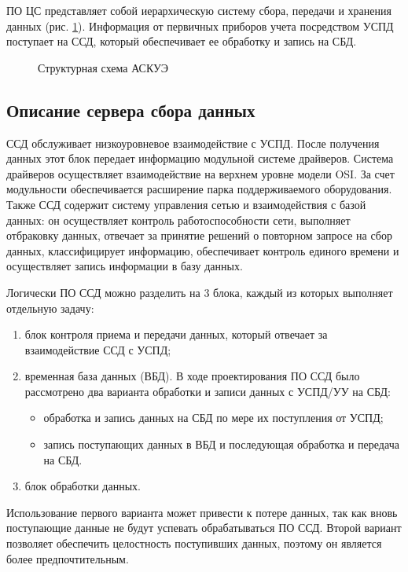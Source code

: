 ПО ЦС представляет собой иерархическую систему сбора, передачи и хранения данных (рис. \ref{irsh:irsh}). Информация от первичных приборов учета посредством УСПД поступает на ССД, который обеспечивает ее обработку и запись на СБД.

\begin{figure}[h!]
 \caption{Структурная схема АСКУЭ}
 \label{irsh:irsh}
\end{figure}

\subsection{Описание сервера сбора данных}

ССД обслуживает низкоуровневое взаимодействие с УСПД. После получения данных этот блок передает информацию модульной системе драйверов. Система драйверов осуществляет взаимодействие на верхнем уровне модели OSI. За счет модульности обеспечивается расширение парка поддерживаемого оборудования. Также ССД содержит систему управления сетью и взаимодействия с базой данных: он осуществляет контроль работоспособности сети, выполняет отбраковку данных, отвечает за принятие решений о повторном запросе на сбор данных, классифицирует информацию, обеспечивает контроль единого времени и осуществляет запись информации в базу данных.

Логически ПО ССД можно разделить на 3 блока, каждый из которых выполняет отдельную задачу:
\begin{enumerate}
\item блок контроля приема и передачи данных, который отвечает за взаимодействие ССД с УСПД;
\item временная база данных (ВБД). В ходе проектирования ПО ССД было рассмотрено два варианта обработки и записи данных с УСПД/УУ на СБД: 
\begin{itemize}
\item обработка и запись данных на СБД по мере их поступления от УСПД;
\item запись поступающих данных в ВБД и последующая обработка и передача на СБД.
\end{itemize}
\item блок обработки данных.
\end{enumerate}

Использование первого варианта может привести к потере данных, так как вновь поступающие данные не будут успевать обрабатываться ПО ССД. Второй вариант позволяет обеспечить целостность поступивших данных, поэтому он является более предпочтительным.

